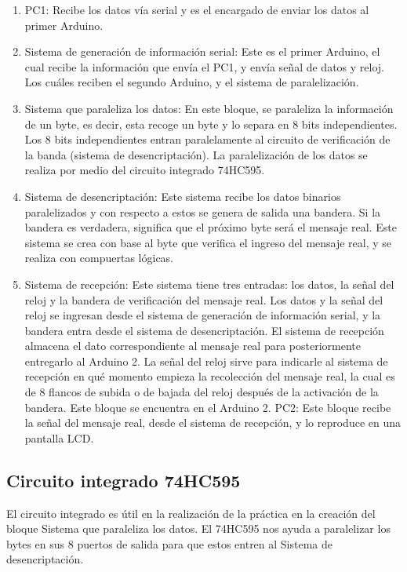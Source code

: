 \documentclass{article}
\begin{document}
\begin{enumerate}
\item PC1: Recibe los datos vía serial y es el encargado de enviar los datos al primer Arduino.

\item Sistema de generación de información serial:  Este es el primer Arduino, el cual recibe la información que envía el PC1, y envía señal de datos y reloj. Los cuáles reciben el segundo Arduino, y el sistema de paralelización.

\item Sistema que paraleliza los datos:  En este bloque, se paraleliza la información de un byte, es decir, esta recoge un byte y lo separa en 8 bits independientes. Los 8 bits independientes entran paralelamente al circuito de verificación de la banda (sistema de desencriptación). La paralelización de los datos se realiza por medio del circuito integrado 74HC595.

\item Sistema de desencriptación: Este sistema recibe los datos binarios paralelizados y con respecto a estos se genera de salida una bandera. Si la bandera es verdadera, significa que el próximo byte será el mensaje real. Este sistema se crea con base al byte que verifica el ingreso del mensaje real, y se realiza con compuertas lógicas.

\item Sistema de recepción: Este sistema tiene tres entradas: los datos, la señal del reloj y la bandera de verificación del mensaje real. Los datos y la señal del reloj se ingresan desde el sistema de generación de información serial, y la bandera entra desde el sistema de desencriptación. El sistema de recepción almacena el dato correspondiente al mensaje real para posteriormente entregarlo al Arduino 2. La señal del reloj sirve para indicarle al sistema de recepción en qué momento empieza la recolección del mensaje real, la cual es de 8 flancos de subida o de bajada del reloj después de la activación de la bandera. Este bloque se encuentra en el Arduino 2.
PC2: Este bloque recibe la señal del mensaje real, desde el sistema de recepción, y lo reproduce en una pantalla LCD.

\end{enumerate}

\subsection{Circuito integrado 74HC595}
El circuito integrado es útil en la realización de la práctica en la creación del bloque Sistema que paraleliza los datos. El 74HC595 nos ayuda a paralelizar los bytes en sus 8 puertos de salida para que estos entren al Sistema de desencriptación.\\
\end{document}
